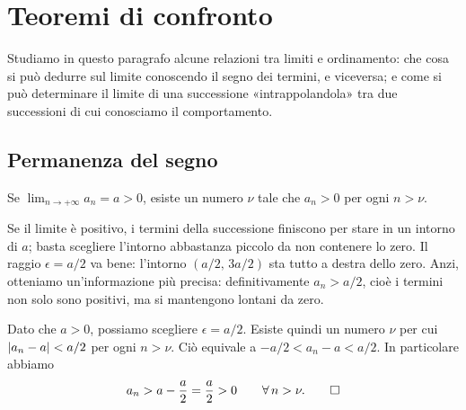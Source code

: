 \section{Teoremi di confronto}
\label{sec:confronto}

Studiamo in questo paragrafo alcune relazioni tra limiti e ordinamento: che cosa si può
dedurre sul limite conoscendo il segno dei termini, e viceversa; e come si può
determinare il limite di una successione «intrappolandola» tra due successioni di cui
conosciamo il comportamento.

\subsection{Permanenza del segno}

\begin{teorema}\label{teo:permanenza-segno}
Se $\displaystyle\lim_{n\to+\infty}a_{n}=a>0$, esiste un numero $\nu$ tale che $a_{n}>0$
per ogni $n>\nu$.
\end{teorema}

\begin{schema}
\end{schema}

\begin{strategia}
Se il limite è positivo, i termini della successione finiscono per stare in un intorno
di $a$; basta scegliere l'intorno abbastanza piccolo da non contenere lo zero. Il raggio
$\epsilon=a/2$ va bene: l'intorno $(a/2,\,3a/2)$ sta tutto a destra dello zero. Anzi,
otteniamo un'informazione più precisa: definitivamente $a_{n}>a/2$, cioè i termini non
solo sono positivi, ma si mantengono lontani da zero.
\end{strategia}

\begin{dimostrazione}
Dato che $a>0$, possiamo scegliere $\epsilon=a/2$. Esiste quindi un numero $\nu$ per cui
$\lvert a_{n}-a\rvert<a/2$ per ogni $n>\nu$. Ciò equivale a $-a/2<a_{n}-a<a/2$. In particolare
abbiamo
\begin{equation}\label{eq:permanenza-passo}
  a_{n}>a-\frac a2=\frac a2>0 \qquad\forall\, n>\nu. \qedhere
\end{equation}
\end{dimostrazione}


